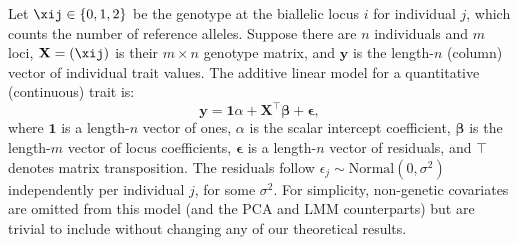 \documentclass[11pt]{article}
\begin{document}
Let $\xij \in \{ 0, 1, 2 \}$ be the genotype at the biallelic locus $i$ for individual $j$, which counts the number of reference alleles.
Suppose there are $n$ individuals and $m$ loci,
$\mathbf{X} = ( \xij )$ is their $m \times n$ genotype matrix, and
$\mathbf{y}$ is the length-$n$ (column) vector of individual trait values.
The additive linear model for a quantitative (continuous) trait is:
\begin{equation}
  \label{eq:trait}
  \mathbf{y}
  =
  \mathbf{1} \alpha + \mathbf{X}^\intercal \boldsymbol{\beta} + \boldsymbol{\epsilon}
  ,
\end{equation}
where
$\mathbf{1}$ is a length-$n$ vector of ones,
$\alpha$ is the scalar intercept coefficient,
$\boldsymbol{\beta}$ is the length-$m$ vector of locus coefficients,
$\boldsymbol{\epsilon}$ is a length-$n$ vector of residuals,
and $\intercal$ denotes matrix transposition.
The residuals follow $\epsilon_j \sim \text{Normal}(0, \sigma^2)$ independently per individual $j$, for some $\sigma^2$.
For simplicity, non-genetic covariates are omitted from this model (and the PCA and LMM counterparts) but are trivial to include without changing any of our theoretical results.
\end{document}
